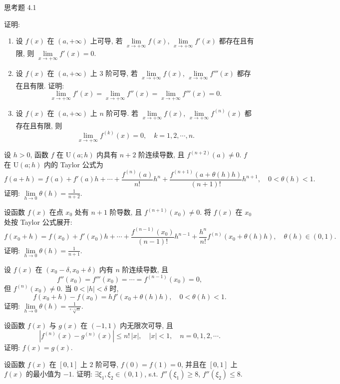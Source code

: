 \begin{exblock}{思考题 4.1}
  \item 证明:
  \begin{enumerate}[label=(\arabic*)]
    \item 设 $f(x)$ 在 $(a,+\infty)$ 上可导, 若 $\lim\limits_{x\to+\infty}f(x)$, $\lim\limits_{x\to+\infty}f'(x)$ 都存在且有限, 则 $\lim\limits_{x\to+\infty}f'(x)=0$.
    \item 设 $f(x)$ 在 $(a,+\infty)$ 上 $3$ 阶可导, 若 $\lim\limits_{x\to+\infty}f(x)$, $\lim\limits_{x\to+\infty}f'''(x)$ 都存在且有限. 证明:
    \[
    \lim_{x\to+\infty}f'(x)=\lim_{x\to+\infty}f''(x)=\lim_{x\to+\infty}f'''(x)=0.
\]
    \item 设 $f(x)$ 在 $(a,+\infty)$ 上 $n$ 阶可导. 若 $\lim\limits_{x\to+\infty}f(x)$, $\lim\limits_{x\to+\infty}f^{(n)}(x)$ 都存在且有限, 则
    \[
    \lim_{x\to+\infty}f^{(k)}(x)=0,\quad k=1,2,\cdots,n.
\]
  \end{enumerate}

  \item 设 $h>0$, 函数 $f$ 在 $\mathrm{U}(a;h)$ 内具有 $n+2$ 阶连续导数, 且 $f^{(n+2)}(a)\neq 0$. $f$ 在 $\mathrm{U}(a;h)$ 内的 Taylor 公式为
  \[
  f(a+h)=f(a)+f'(a)h+\cdots+\frac{f^{(n)}(a)}{n!}h^{n}+\frac{f^{(n+1)}(a+\theta(h)h)}{(n+1)!}h^{n+1},\quad 0<\theta(h)<1.
\]
  证明: $\lim\limits_{h\to 0}\theta(h)=\frac{1}{n+2}$.

  \item 设函数 $f(x)$ 在点 $x_{0}$ 处有 $n+1$ 阶导数, 且 $f^{(n+1)}(x_{0})\neq 0$. 将 $f(x)$ 在 $x_{0}$ 处按 Taylor 公式展开:
  \[
  f(x_{0}+h)=f(x_{0})+f'(x_{0})h+\cdots+\frac{f^{(n-1)}(x_{0})}{(n-1)!}h^{n-1}+\frac{h^{n}}{n!}f^{(n)}(x_{0}+\theta(h)h),\quad \theta(h)\in(0,1).
\]
  证明: $\lim\limits_{h\to 0}\theta(h)=\frac{1}{n+1}$.

  \item 设 $f(x)$ 在 $(x_{0}-\delta,x_{0}+\delta)$ 内有 $n$ 阶连续导数, 且
  \[
  f''(x_{0})=f'''(x_{0})=\cdots=f^{(n-1)}(x_{0})=0,
\]
  但 $f^{(n)}(x_{0})\neq 0$. 当 $0<|h|<\delta$ 时,
  \[
  f(x_{0}+h)-f(x_{0})=hf'(x_{0}+\theta(h)h),\quad 0<\theta(h)<1.
\]
  证明: $\lim\limits_{h\to 0}\theta(h)=\frac{1}{\sqrt[n-1]{n}}$.

  \item 设函数 $f(x)$ 与 $g(x)$ 在 $(-1,1)$ 内无限次可导, 且
  \[
  |f^{(n)}(x)-g^{(n)}(x)|\leqslant n!\,|x|,\quad |x|<1,\quad n=0,1,2,\cdots.
\]
  证明: $f(x)=g(x)$.

  \item 设函数 $f(x)$ 在 $[0,1]$ 上 $2$ 阶可导, $f(0)=f(1)=0$, 并且在 $[0,1]$ 上 $f(x)$ 的最小值为 $-1$. 证明: $\exists \xi_{1},\xi_{2}\in(0,1)$, s.t. $f''(\xi_{1})\geqslant 8$, $f''(\xi_{2})\leqslant 8$.


\end{exblock}
